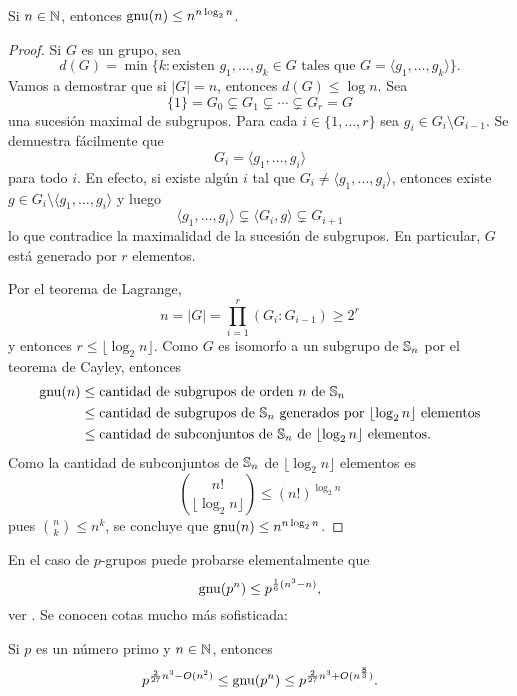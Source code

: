 \begin{theorem}
Si $n\in\mathbb{N}$, entonces $\operatorname{gnu}(n)\leq n^{n\log_2 n}$.
\end{theorem}

\begin{proof}
Si $G$ es un grupo, sea 
\[
d(G)=\min\{k:\text{existen $g_1,\dots,g_k\in G$ tales que $G=\langle g_1,\dots,g_k\rangle$}\}.
\]
Vamos a demostrar que si $|G|=n$, entonces $d(G)\leq\log n$. Sea
\[
\{1\}=G_0\subsetneq G_1\subsetneq\cdots\subsetneq G_r=G
\]
una sucesión maximal de subgrupos. Para cada $i\in\{1,\dots,r\}$ sea
$g_i\in G_i\setminus G_{i-1}$. Se demuestra fácilmente
que 
\[
G_i=\langle g_1,\dots,g_i\rangle
\]
para todo $i$. 
En efecto, si existe algún $i$ tal que $G_i\ne\langle g_1,\dots,g_i\rangle$, entonces
existe $g\in G_i\setminus\langle g_1,\dots,g_i\rangle$ y luego
\[
\langle g_1,\dots,g_i\rangle\subsetneq \langle G_i,g\rangle\subsetneq G_{i+1}
\]
lo que contradice la maximalidad de la sucesión de subgrupos. En particular, $G$ está generado 
por $r$ elementos.

Por el teorema de Lagrange, 
\[
n=|G|=\prod_{i=1}^r(G_i:G_{i-1})\geq 2^r
\]
y entonces $r\leq\lfloor \log_2 n\rfloor$. 
Como $G$ es isomorfo a un 
subgrupo de $\mathbb{S}_n$ por el teorema de Cayley, entonces 
\begin{align*}
\operatorname{gnu}(n)
&\leq\text{cantidad de subgrupos de orden $n$ de $\mathbb{S}_n$}\\
&\leq\text{cantidad de subgrupos de $\mathbb{S}_n$ generados por $\lfloor\log_2n\rfloor$ elementos}\\
&\leq\text{cantidad de subconjuntos de $\mathbb{S}_n$ de $\lfloor\log_2n\rfloor$ elementos}.
\end{align*}
Como la cantidad de subconjuntos de $\mathbb{S}_n$ de $\lfloor\log_2n\rfloor$ elementos
es
\[
\binom{n!}{\lfloor\log_2n\rfloor}\leq(n!)^{\log_2n}
\]
pues $\binom{n}{k}\leq n^k$, se concluye que $\operatorname{gnu}(n)\leq n^{n\log_2n}$. 
\end{proof}

En el caso de $p$-grupos puede probarse elementalmente que 
\[
\operatorname{gnu}(p^n)\leq p^{\frac16(n^3-n)},
\]
ver \cite[Theorem 5.1]{MR2382539}. Se conocen 
cotas mucho más sofisticada: 

\begin{theorem}
Si $p$ es un número primo y $n\in\mathbb{N}$, entonces 
\[
p^{\frac{2}{27}n^3-O(n^2)}\leq\operatorname{gnu}(p^n)\leq p^{\frac{2}{27}n^3+O(n^{\frac{8}{3}})}.
\]
\end{theorem}

